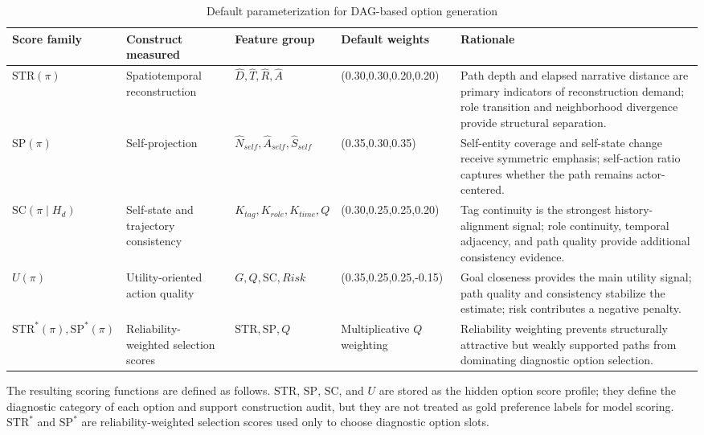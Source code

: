 \documentclass[pdflatex,sn-mathphys-num]{sn-jnl}%
\theoremstyle{thmstyleone}%
\theoremstyle{thmstyletwo}%
\theoremstyle{thmstylethree}%
\begin{document}
\begin{table}
\centering
\small
\caption{Default parameterization for DAG-based option generation}
\label{tab:default-parameterization-for-dag-based-o}
\begin{tabular}{p{}p{}p{}p{}p{}}
\toprule
Score family & Construct measured & Feature group & Default weights & Rationale \\
\midrule
$\mathrm{STR}(\pi)$ & Spatiotemporal reconstruction & $\hat{D},\hat{T},\hat{R},\hat{A}$ & (0.30,0.30,0.20,0.20) & Path depth and elapsed narrative distance are primary indicators of reconstruction demand; role transition and neighborhood divergence provide structural separation. \\
$\mathrm{SP}(\pi)$ & Self-projection & $\hat{N}_{self},\hat{A}_{self},\hat{S}_{self}$ & (0.35,0.30,0.35) & Self-entity coverage and self-state change receive symmetric emphasis; self-action ratio captures whether the path remains actor-centered. \\
$\mathrm{SC}(\pi\mid H_d)$ & Self-state and trajectory consistency & $K_{tag},K_{role},K_{time},Q$ & (0.30,0.25,0.25,0.20) & Tag continuity is the strongest history-alignment signal; role continuity, temporal adjacency, and path quality provide additional consistency evidence. \\
$U(\pi)$ & Utility-oriented action quality & $G,Q,\mathrm{SC},Risk$ & (0.35,0.25,0.25,-0.15) & Goal closeness provides the main utility signal; path quality and consistency stabilize the estimate; risk contributes a negative penalty. \\
$\mathrm{STR}^{*}(\pi),\mathrm{SP}^{*}(\pi)$ & Reliability-weighted selection scores & $\mathrm{STR},\mathrm{SP},Q$ & Multiplicative $Q$ weighting & Reliability weighting prevents structurally attractive but weakly supported paths from dominating diagnostic option selection. \\
\bottomrule
\end{tabular}
\end{table}

The resulting scoring functions are defined as follows. $\mathrm{STR}$, $\mathrm{SP}$, $\mathrm{SC}$, and $U$ are stored as the hidden option score profile; they define the diagnostic category of each option and support construction audit, but they are not treated as gold preference labels for model scoring. $\mathrm{STR}^{*}$ and $\mathrm{SP}^{*}$ are reliability-weighted selection scores used only to choose diagnostic option slots.
\end{document}

